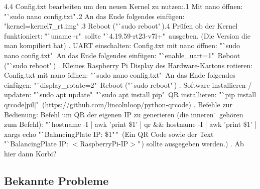\documentclass[12pt,a4paper,bibliography=totoc,listof=totoc]{scrartcl}
\begin{document}
4.4 Config.txt bearbeiten um den neuen Kernel zu nutzen:.1 Mit nano öffnen: "`sudo nano config.txt"\,.2 An das Ende folgendes einfügen: "kernel=kernel7\_rt.img"\,.3 Reboot ("`sudo reboot"\,).4 Prüfen ob der Kernel funktioniert: "`uname -r" \,sollte "`4.19.59-rt23-v7l+"\, ausgeben. 
      (Die Version die man kompiliert hat)\newline
{}. UART einschalten: Config.txt mit nano öffnen: "`sudo nano config.txt"\, An das Ende folgendes einfügen: "`enable\_uart=1"\, Reboot ("`sudo reboot"\,)\newline
{}. Kleines Raspberry Pi Display des Hardware-Kartons rotieren: Config.txt mit nano öffnen: "`sudo nano config.txt"\, An das Ende folgendes einfügen: "`display\_rotate=2"\, Reboot ("`sudo reboot"\,)\newline
{}. Software installieren / updaten: "`sudo apt update"\, "`sudo apt install pip"\, QR installieren: "`pip install qrcode[pil]"\,
    (https://github.com/lincolnloop/python-qrcode)\newline
{}. Befehle zur Bedienung: Befehl um QR der eigenen IP zu generieren (die inneren \"\, gehören zum Befehl):
    "`hostname -I | awk '{print \$1}' | qr \&\& hostname -I | awk '{print \$1}' | xargs echo "`BalancingPlate IP: \$1"\,"\,
    (Ein QR Code sowie der Text "`BalancingPlate IP: $<$RaspberryPi-IP$>$"\,) sollte ausgegeben werden.)
. Ab hier dann Korbi?


\subsection{Bekannte Probleme}
\end{document}
